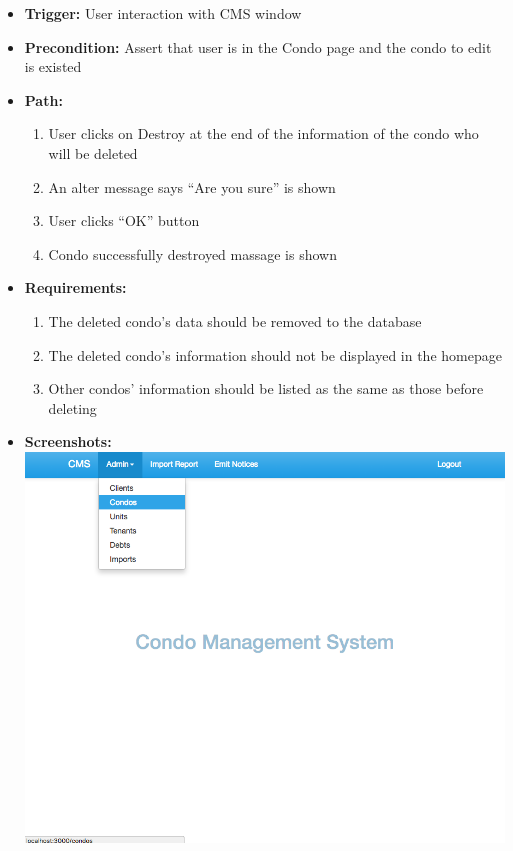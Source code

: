 \begin{itemize}
  \item[] \textbf{Trigger:} User interaction with CMS window
  \item[] \textbf{Precondition:} Assert that user is in the Condo page and the condo to edit is existed
  \item[] \textbf{Path:}
    \begin{enumerate}
      \item User clicks on Destroy at the end of the information of the condo who will be deleted
      \item An alter message says ``Are you sure'' is shown
      \item User clicks ``OK'' button
      \item Condo successfully destroyed massage is shown
    \end{enumerate}
  \item[] \textbf{Requirements:}
    \begin{enumerate}
      \item The deleted condo’s data should be removed to the database
      \item The deleted condo’s information should not be displayed in the homepage
      \item Other condos’ information should be listed as the same as those before deleting
    \end{enumerate}
  \item[] \textbf{Screenshots:}\\
    \includegraphics[scale=0.25]{./images/ss/condo/delete/1.png}

\end{itemize}
